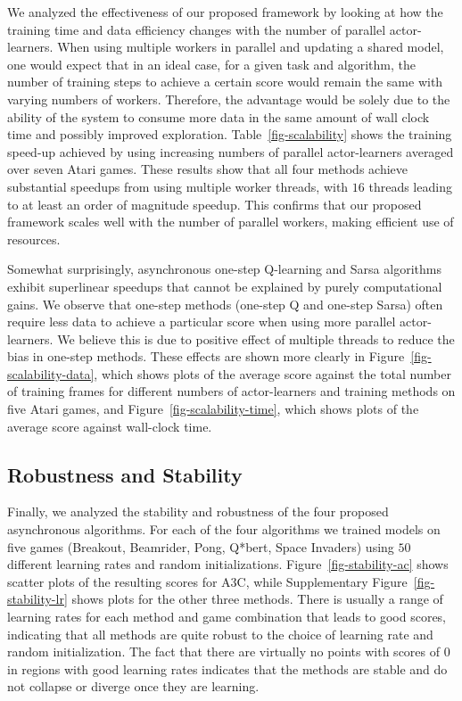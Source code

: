 %
We analyzed the effectiveness of our proposed framework by looking at how the training time and data efficiency changes with the number of parallel actor-learners.
When using multiple workers in parallel and updating a shared model, one would expect that in an ideal case, for a given task and algorithm, the number of training steps to achieve a certain score would remain the same with varying numbers of workers.
Therefore, the advantage would be solely due to the ability of the system to consume more data in the same amount of wall clock time and possibly improved exploration.
Table~\ref{fig-scalability} shows the training speed-up achieved by using increasing numbers of parallel actor-learners averaged over seven Atari games.
These results show that all four methods achieve substantial speedups from using multiple worker threads, with $16$ threads leading to at least an order of magnitude speedup.
This confirms that our proposed framework scales well with the number of parallel workers, making efficient use of resources.

%
%
%
%
%
%
%
%
%
%
%
%
%
%
%
%
%
%

%
%
%
%
%
%


Somewhat surprisingly, asynchronous one-step Q-learning and Sarsa algorithms exhibit superlinear speedups that cannot be explained by purely computational gains.
We observe that one-step methods (one-step Q and one-step Sarsa) often require less data to achieve a particular score when using more parallel actor-learners.
We believe this is due to positive effect of multiple threads to reduce the bias in one-step methods.
These effects are shown more clearly in Figure~\ref{fig-scalability-data}, which shows plots of the average score against the total number of training frames for different numbers of actor-learners and training methods on five Atari games, and Figure~\ref{fig-scalability-time}, which shows plots of the average score against wall-clock time.
%
%
%
%
%

\subsection{Robustness and Stability}
Finally, we analyzed the stability and robustness of the four proposed asynchronous algorithms.
For each of the four algorithms we trained models on five games (Breakout, Beamrider, Pong, Q*bert, Space Invaders) using $50$ different learning rates and random initializations.
Figure~\ref{fig-stability-ac} shows scatter plots of the resulting scores for A3C, while Supplementary Figure~\ref{fig-stability-lr} shows plots for the other three methods.
There is usually a range of learning rates for each method and game combination that leads to good scores, indicating that all methods are quite robust to the choice of learning rate and random initialization.
The fact that there are virtually no points with scores of $0$ in regions with good learning rates indicates that the methods are stable and do not collapse or diverge once they are learning.
%
%
%

